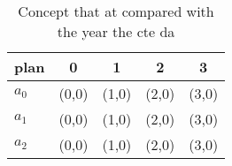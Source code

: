 \documentclass[a4paper]{article}
\begin{document}
\begin{table}
\begin{adjustbox}{width=0.6\columnwidth}
\begin{tabular}{|l|l|l|l|l|}
\hline
\textbf{plan} & \multicolumn{1}{c|}{\textbf{0}} & \multicolumn{1}{c|}{\textbf{1}} & \multicolumn{1}{c|}{\textbf{2}} & \multicolumn{1}{c|}{\textbf{3}} \\ \hline
\textbf{$a_0$}  & (0,0) & (1,0) & (2,0) & (3,0) \\ \hline
\textbf{$a_1$}  & (0,0) & (1,0) & (2,0) & (3,0) \\ \hline
\textbf{$a_2$}  & (0,0) & (1,0) & (2,0) & (3,0) \\ \hline
\end{tabular}
\end{adjustbox}
\caption{Concept that at compared with the year the cte da
}
\end{table}
\end{document}
